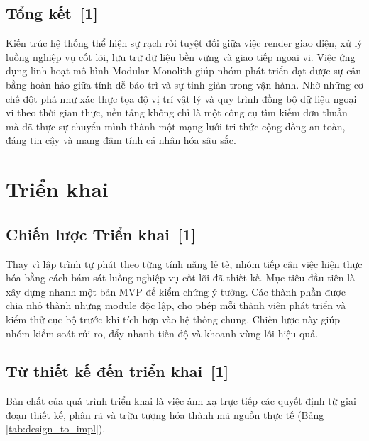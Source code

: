 \documentclass[12pt, a4paper]{article}
\begin{document}
\subsection[Tổng kết]{Tổng kết \,{\normalfont\small\textcolor{cyan!70!black}{[1]}}}
Kiến trúc hệ thống thể hiện sự rạch ròi tuyệt đối giữa việc render giao diện, xử lý luồng nghiệp vụ cốt lõi, lưu trữ dữ liệu bền vững và giao tiếp ngoại vi. Việc ứng dụng linh hoạt mô hình Modular Monolith giúp nhóm phát triển đạt được sự cân bằng hoàn hảo giữa tính dễ bảo trì và sự tinh giản trong vận hành. Nhờ những cơ chế đột phá như xác thực tọa độ vị trí vật lý và quy trình đồng bộ dữ liệu ngoại vi theo thời gian thực, nền tảng không chỉ là một công cụ tìm kiếm đơn thuần mà đã thực sự chuyển mình thành một mạng lưới tri thức cộng đồng an toàn, đáng tin cậy và mang đậm tính cá nhân hóa sâu sắc.
\section{Triển khai}

\subsection[Chiến lược Triển khai]{Chiến lược Triển khai \,{\normalfont\small\textcolor{cyan!70!black}{[1]}}}
Thay vì lập trình tự phát theo từng tính năng lẻ tẻ, nhóm tiếp cận việc hiện thực hóa bằng cách bám sát luồng nghiệp vụ cốt lõi đã thiết kế. Mục tiêu đầu tiên là xây dựng nhanh một bản MVP để kiểm chứng ý tưởng. Các thành phần được chia nhỏ thành những module độc lập, cho phép mỗi thành viên phát triển và kiểm thử cục bộ trước khi tích hợp vào hệ thống chung. Chiến lược này giúp nhóm kiểm soát rủi ro, đẩy nhanh tiến độ và khoanh vùng lỗi hiệu quả.

\subsection[Từ thiết kế đến triển khai]{Từ thiết kế đến triển khai \,{\normalfont\small\textcolor{cyan!70!black}{[1]}}}
Bản chất của quá trình triển khai là việc ánh xạ trực tiếp các quyết định từ giai đoạn thiết kế, phân rã và trừu tượng hóa thành mã nguồn thực tế (Bảng \ref{tab:design_to_impl}).
\end{document}
